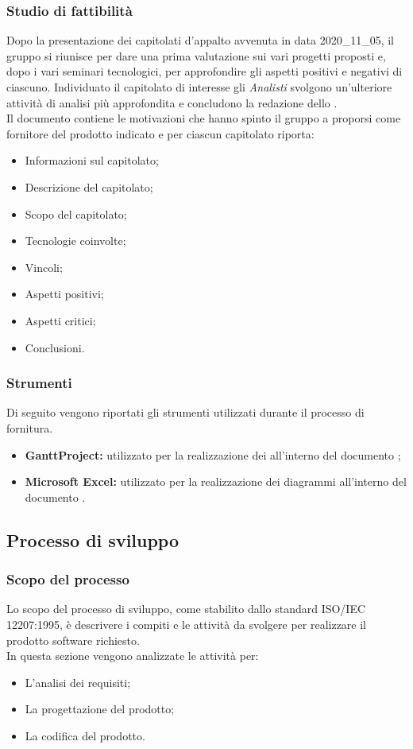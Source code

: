 \subsubsection{Studio di fattibilità}\label{SdF}
Dopo la presentazione dei capitolati d'appalto avvenuta in data 2020\_11\_05, il gruppo si riunisce per dare una prima valutazione sui vari progetti proposti e, dopo i vari seminari tecnologici, per approfondire gli aspetti positivi e negativi di ciascuno. Individuato il capitolato di interesse gli \textit{Analisti} svolgono un'ulteriore attività di analisi più approfondita e concludono la redazione dello \SdFv.\\
Il documento contiene le motivazioni che hanno spinto il gruppo a proporsi come fornitore del prodotto indicato e per ciascun capitolato riporta:
\begin{itemize}
\item Informazioni sul capitolato;
\item Descrizione del capitolato;
\item Scopo del capitolato;
\item Tecnologie coinvolte; 
\item Vincoli;
\item Aspetti positivi;
\item Aspetti critici;
\item Conclusioni.
\end{itemize}

\subsubsection{Strumenti}\label{PF_Strumenti}
Di seguito vengono riportati gli strumenti utilizzati durante il processo di fornitura.
\begin{itemize}
	\item \textbf{GanttProject:} utilizzato per la realizzazione dei  all'interno del documento ;
	\item \textbf{Microsoft Excel:} utilizzato per la realizzazione dei diagrammi all'interno del documento .
\end{itemize}
\newpage

\subsection{Processo di sviluppo}
\subsubsection{Scopo del processo}\label{PS_Scopo}
Lo scopo del processo di sviluppo, come stabilito dallo standard ISO/IEC 12207:1995, è descrivere i compiti e le attività da svolgere per realizzare il prodotto software richiesto.\\
In questa sezione vengono analizzate le attività per:
\begin{itemize}
	\item L'analisi dei requisiti;
	\item La progettazione del prodotto;
	\item La codifica del prodotto.
\end{itemize}

